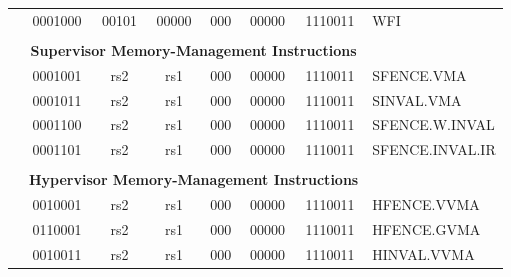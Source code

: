 \begin{table}[p]
\begin{small}
\begin{center}
\begin{tabular}{p{0in}p{0.4in}p{0.05in}p{0.05in}p{0.05in}p{0.05in}p{0.4in}p{0.6in}p{0.4in}p{0.6in}p{0.7in}l}
&
\multicolumn{4}{|c|}{0001000} &
\multicolumn{2}{c|}{00101} &
\multicolumn{1}{c|}{00000} &
\multicolumn{1}{c|}{000} &
\multicolumn{1}{c|}{00000} &
\multicolumn{1}{c|}{1110011} & WFI \\
\cline{2-11}
  

&
\multicolumn{10}{c}{} & \\
&
\multicolumn{10}{c}{\bf Supervisor Memory-Management Instructions} & \\
\cline{2-11}
  

&
\multicolumn{4}{|c|}{0001001} &
\multicolumn{2}{c|}{rs2} &
\multicolumn{1}{c|}{rs1} &
\multicolumn{1}{c|}{000} &
\multicolumn{1}{c|}{00000} &
\multicolumn{1}{c|}{1110011} & SFENCE.VMA \\
\cline{2-11}
  

&
\multicolumn{4}{|c|}{0001011} &
\multicolumn{2}{c|}{rs2} &
\multicolumn{1}{c|}{rs1} &
\multicolumn{1}{c|}{000} &
\multicolumn{1}{c|}{00000} &
\multicolumn{1}{c|}{1110011} & SINVAL.VMA \\
\cline{2-11}
  

&
\multicolumn{4}{|c|}{0001100} &
\multicolumn{2}{c|}{rs2} &
\multicolumn{1}{c|}{rs1} &
\multicolumn{1}{c|}{000} &
\multicolumn{1}{c|}{00000} &
\multicolumn{1}{c|}{1110011} & SFENCE.W.INVAL \\
\cline{2-11}
  

&
\multicolumn{4}{|c|}{0001101} &
\multicolumn{2}{c|}{rs2} &
\multicolumn{1}{c|}{rs1} &
\multicolumn{1}{c|}{000} &
\multicolumn{1}{c|}{00000} &
\multicolumn{1}{c|}{1110011} & SFENCE.INVAL.IR \\
\cline{2-11}
  

&
\multicolumn{10}{c}{} & \\
&
\multicolumn{10}{c}{\bf Hypervisor Memory-Management Instructions} & \\
\cline{2-11}
  

&
\multicolumn{4}{|c|}{0010001} &
\multicolumn{2}{c|}{rs2} &
\multicolumn{1}{c|}{rs1} &
\multicolumn{1}{c|}{000} &
\multicolumn{1}{c|}{00000} &
\multicolumn{1}{c|}{1110011} & HFENCE.VVMA \\
\cline{2-11}
  

&
\multicolumn{4}{|c|}{0110001} &
\multicolumn{2}{c|}{rs2} &
\multicolumn{1}{c|}{rs1} &
\multicolumn{1}{c|}{000} &
\multicolumn{1}{c|}{00000} &
\multicolumn{1}{c|}{1110011} & HFENCE.GVMA \\
\cline{2-11}
  

&
\multicolumn{4}{|c|}{0010011} &
\multicolumn{2}{c|}{rs2} &
\multicolumn{1}{c|}{rs1} &
\multicolumn{1}{c|}{000} &
\multicolumn{1}{c|}{00000} &
\multicolumn{1}{c|}{1110011} & HINVAL.VVMA \\
\cline{2-11}
  


\end{tabular}
\end{center}
\end{small}
\end{table}
